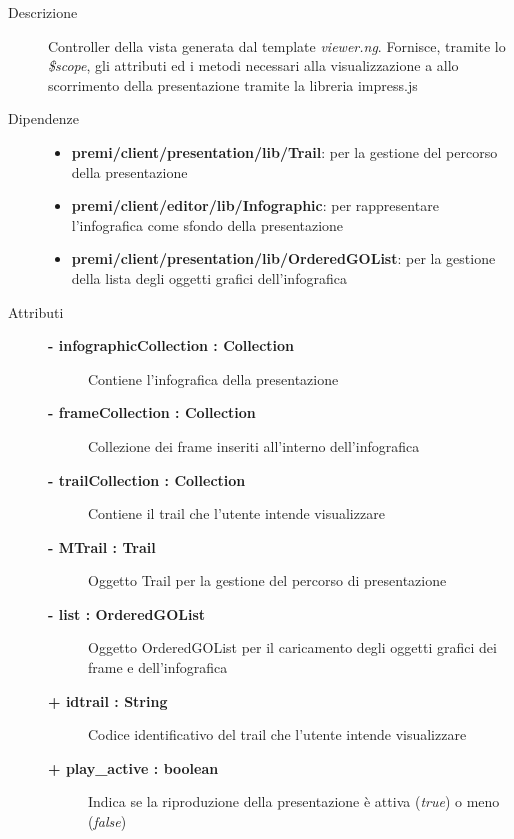 \begin{description}
\item[Descrizione] \hfill
	Controller della vista generata dal template \textit{viewer.ng}. Fornisce, tramite lo \textit{\$scope}, gli attributi ed i metodi necessari alla visualizzazione a allo scorrimento della presentazione tramite la libreria impress.js
	
	
	
\item[Dipendenze] \hfill
	\begin{itemize}
		\item \textbf{premi/client/presentation/lib/Trail}: per la gestione del percorso della presentazione
		\item \textbf{premi/client/editor/lib/Infographic}: per rappresentare l'infografica come sfondo della presentazione
		\item \textbf{premi/client/presentation/lib/OrderedGOList}: per la gestione della lista degli oggetti grafici dell'infografica
	\end{itemize}
	
	
\item[Attributi] \hfill
	\begin{description}
		\item[\textbf{- infographicCollection : Collection			}] \hfill
			Contiene l'infografica della presentazione
		\item[\textbf{- frameCollection : Collection			}] \hfill
			Collezione dei frame inseriti all'interno dell'infografica
		\item[\textbf{- trailCollection : Collection			}] \hfill
			Contiene il trail che l'utente intende visualizzare
		\item[\textbf{- MTrail : Trail			}] \hfill
			Oggetto Trail per la gestione del percorso di presentazione
		\item[\textbf{- list : OrderedGOList			}] \hfill
			Oggetto OrderedGOList per il caricamento degli oggetti grafici dei frame e dell'infografica
		\item[\textbf{+ idtrail : String			}] \hfill
			Codice identificativo del trail che l'utente intende visualizzare
		\item[\textbf{+ play\_active : boolean			}] \hfill
			Indica se la riproduzione della presentazione è attiva (\textit{true}) o meno (\textit{false})
	\end{description}
	

\end{description}
